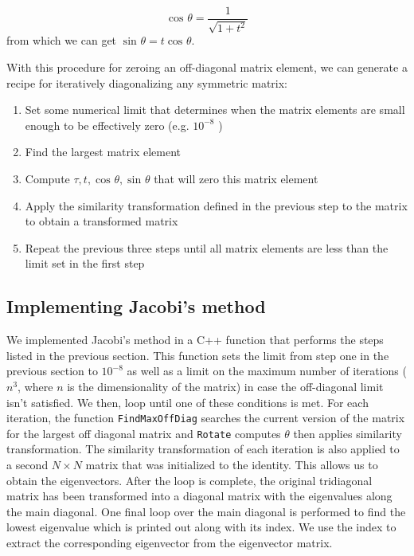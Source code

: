 \documentclass[10pt,showpacs,preprintnumbers,footinbib,amsmath,amssymb,aps,prl,twocolumn,groupedaddress,superscriptaddress,showkeys]{revtex4-1}
\newcommand{\costa}[1]{%
	\ensuremath{\cos ^{#1} {\theta}} }
\newcommand{\sinta}[1]{%
	\ensuremath{\sin ^{#1} {\theta}} }
\newcommand{\pwrten}[1]{%
	\ensuremath{10^{#1}} }
\begin{document}
{\begin{equation*}
	\costa{} = \frac{1}{ \sqrt{1 + t ^2}}
\end{equation*}
from which we can get $\sinta{} = t \costa{}$.

With this procedure for zeroing an off-diagonal matrix element, we can generate
a recipe for iteratively diagonalizing any symmetric matrix:

\begin{enumerate}
	\item Set some numerical limit that determines when the matrix elements
	are small enough to be effectively zero (e.g. \pwrten{-8})
	\item Find the largest matrix element
	\item Compute $\tau,t,\costa{},\sinta{}$ that will zero this matrix element
	\item Apply the similarity transformation defined in the previous step to the
	matrix to obtain a transformed matrix
	\item Repeat the previous three steps until all matrix elements are less than
	the limit set in the first step
\end{enumerate}

\subsection{Implementing Jacobi's method}

We implemented Jacobi's method in a C++ function that performs the steps listed
in the previous section. This function sets the limit from step one in the previous
section to \pwrten{-8} as well as a limit on the maximum number of iterations ($n^3$,
where $n$ is the dimensionality of the matrix) in case the off-diagonal limit
isn't satisfied. We then, loop until one of these conditions is met. For each iteration,
the function \texttt{FindMaxOffDiag} searches the current version of the matrix for
the largest off diagonal matrix and \texttt{Rotate} computes $\theta$ then applies
similarity transformation. The similarity transformation of each iteration is also applied
to a second $N \times N$ matrix that was initialized to the identity. This allows us to
obtain the eigenvectors. After the loop is complete, the original tridiagonal matrix
has been transformed into a diagonal matrix with the eigenvalues along the main
diagonal. One final loop over the main diagonal is performed to find the lowest
eigenvalue which is printed out along with its index. We use the index to extract
the corresponding eigenvector from the eigenvector matrix.


}
\end{document}
